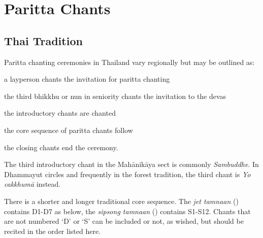 \chapter{Paritta Chants}

\section{Thai Tradition}

Paritta chanting ceremonies in Thailand vary regionally but may be outlined as:

\begin{packeditemize}
  \item a layperson chants the invitation for paritta chanting
  \item the third bhikkhu or nun in seniority chants the invitation to the devas
  \item the introductory chants are chanted
  \item the core sequence of paritta chants follow
  \item the closing chants end the ceremony.
\end{packeditemize}

The third introductory chant in the Mahānikāya sect is commonly \emph{Sambuddhe}.
In Dhammayut circles and frequently in the forest tradition, the third chant is
\emph{Yo cakkhumā} instead.

There is a shorter and longer traditional core sequence. The \emph{jet tamnaan}
() contains D1-D7 as below, the \emph{sipsong tamnaan}
() contains S1-S12. Chants that are not numbered `D' or `S' can
be included or not, as wished, but should be recited in the order listed here.

\clearpage


